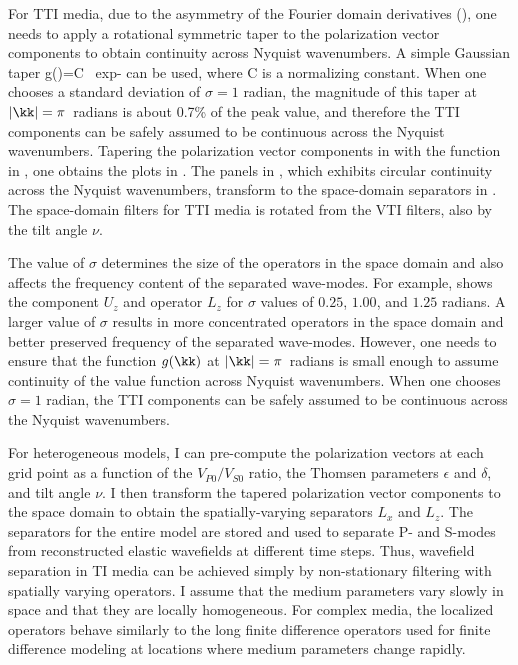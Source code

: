 For TTI media, due to the asymmetry of the Fourier domain derivatives
(), one needs to apply a rotational symmetric
taper to the polarization vector components to obtain continuity
across Nyquist wavenumbers. A simple Gaussian taper
%
\beq\label{gaussiantaper}
g(\kk)=C \, exp\lb-\rb
\eeq
%
can be used, where C is a normalizing constant.  When one chooses a
standard deviation of $\sigma=1$ radian, the magnitude of this taper
at $\left|\kk\right|=\pi$~radians is about 0.7\% of the peak value,
and therefore the TTI components can be safely assumed to be
continuous across the Nyquist wavenumbers.
Tapering the polarization vector components
in  with the function 
in , one obtains the plots
in .  The panels
in , which exhibits circular continuity
across the Nyquist wavenumbers, transform to the space-domain separators 
in .  The space-domain
filters for TTI media is rotated from the VTI filters, also by the
tilt angle $\nu$.

The value of $\sigma$ determines the size of the operators in the
space domain and also affects the frequency content of the separated
wave-modes. For example,  shows the component $U_z$
and operator $L_z$ for $\sigma$ values of $0.25$, $1.00$, and $1.25$
radians.  A larger value of $\sigma$ results in more concentrated
operators in the space domain and better preserved frequency of the
separated wave-modes. However, one needs to ensure that the function
$g(\kk)$ at $\left|\kk\right|=\pi$~radians is small enough to assume
continuity of the value function across Nyquist wavenumbers. When one
chooses $\sigma=1$ radian, the TTI components can be safely assumed to
be continuous across the Nyquist wavenumbers. %

For heterogeneous models, I can pre-compute the polarization vectors
at each grid point as a function of the $V_{P0}/ V_{S0}$ ratio, the
Thomsen parameters $\epsilon$ and $\delta$, and tilt angle $\nu$. I
then transform the tapered polarization vector components to the space
domain to obtain the spatially-varying separators $L_x$ and $L_z$. The
separators for the entire model are stored and used to separate P- and
S-modes from reconstructed elastic wavefields at different time
steps. Thus, wavefield separation in TI media can be achieved simply
by non-stationary filtering with spatially varying operators.  I
assume that the medium parameters vary slowly in space and that they
are locally homogeneous. For complex media, the localized operators
behave similarly to the long finite difference operators used for
finite difference modeling at locations where medium parameters change
rapidly.


